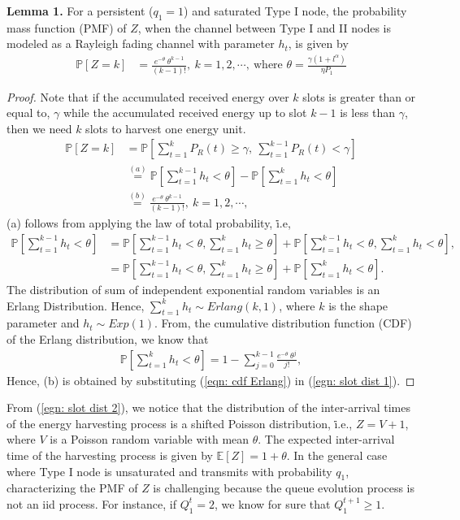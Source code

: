 \documentclass[draftcls,12pt,onecolumn]{IEEEtran}
\begin{document}
\indent \textbf{Lemma 1.} For a persistent ($q_1\!=\!1$) and saturated Type I node, the probability mass function (PMF) of $Z$, when the channel between Type I and II nodes is modeled as a Rayleigh fading channel with parameter $h_t$, is given by
\begin{align}
\mathbb{P}[Z=k]&=\frac{e^{-\theta} \ \theta^{k-1}}{(k-1)!}, \ k=1,2,\cdots, \ \text{where } \theta=\frac{\gamma (1+l^\alpha)}{\eta P_1}
\end{align}
\begin{proof}
Note that if the accumulated received energy over $k$ slots is greater than or equal to, $\gamma$ while the accumulated received energy up to slot $k-1$ is less than $\gamma$, then we need $k$ slots to harvest one energy unit.
\begin{align} 
\mathbb{P}[Z=k]&= \mathbb{P}\left[  \sum_{t=1}^{k} P_{R}(t) \geq \gamma, \ \sum_{t=1}^{k-1} P_{R}(t) < \gamma\right]  \\
&\stackrel{(a)}{=} \mathbb{P}\left[ \sum_{t=1}^{k-1} h_{t} < \theta \right]- \mathbb{P}\left[ \sum_{t=1}^{k} h_{t} < \theta\right] \label{egn: slot dist 1} \\
&\stackrel{(b)}{=} \frac{e^{-\theta} \ \theta^{k-1}}{(k-1)!}, \ k=1,2,\cdots, \label{egn: slot dist 2}
\end{align}
(a) follows from applying the law of total probability, \.i.e, 
\begin{align}
\mathbb{P}\left[ \sum_{t=1}^{k-1} h_{t} < \theta \right] &= \mathbb{P}\left[ \sum_{t=1}^{k-1} h_{t} < \theta, \sum_{t=1}^{k} h_{t} \geq \theta \right] + \mathbb{P}\left[ \sum_{t=1}^{k-1} h_{t} < \theta, \sum_{t=1}^{k} h_{t} < \theta \right],\\
&= \mathbb{P}\left[ \sum_{t=1}^{k-1} h_{t} < \theta, \sum_{t=1}^{k} h_{t} \geq \theta \right] + \mathbb{P}\left[ \sum_{t=1}^{k} h_{t} < \theta \right].
\end{align}  
The distribution of sum of independent exponential random variables is an Erlang Distribution. Hence, $\sum_{t=1}^{k} h_{t} \sim \textit{Erlang}(k,1)$, where $k$ is the shape parameter and $h_t \sim \textit{Exp}(1)$. From, the cumulative distribution function (CDF) of the Erlang distribution, we know that   
\begin{align} \label{eqn: cdf Erlang}
\mathbb{P}\left[ \sum_{t=1}^{k} h_{t} < \theta \right]= 1- \sum_{j=0}^{k-1} \frac{e^{-\theta} \ \theta^{j}}{j!}, 
\end{align}
Hence, (b) is obtained by substituting (\ref{eqn: cdf Erlang}) in (\ref{egn: slot dist 1}). 
\end{proof}
From (\ref{egn: slot dist 2}), we notice that the distribution of the inter-arrival times of the energy harvesting process is a shifted Poisson distribution, \.i.e., $Z=V+1$, where $V$ is a Poisson random variable with mean $\theta$. The expected inter-arrival time of the harvesting process is given by $\mathbb{E}[Z]=1+\theta$. In the general case where Type I node is unsaturated and transmits with probability $q_1$, characterizing the PMF of $Z$ is challenging because the queue evolution process is not an iid process. For instance, if $Q_1^t=2$, we know for sure that $Q_1^{t+1}\geq 1$.
\end{document}
